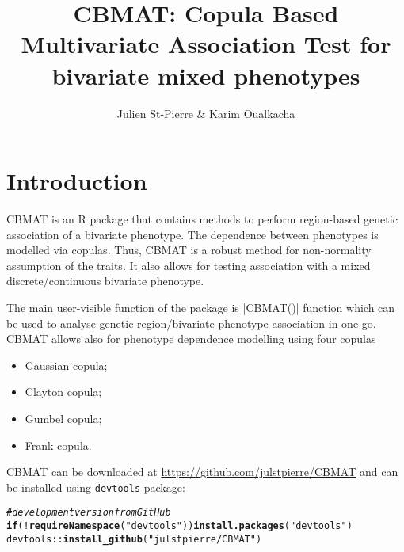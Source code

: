 \documentclass{article}\usepackage[]{graphicx}\usepackage[]{color}
\title{CBMAT: Copula Based Multivariate Association Test for bivariate mixed phenotypes}
\author{Julien St-Pierre \& Karim Oualkacha}
\makeatletter
\newcommand{\hlstr}[1]{\textcolor[rgb]{0.192,0.494,0.8}{#1}}%
\newcommand{\hlcom}[1]{\textcolor[rgb]{0.678,0.584,0.686}{\textit{#1}}}%
\newcommand{\hlopt}[1]{\textcolor[rgb]{0,0,0}{#1}}%
\newcommand{\hlstd}[1]{\textcolor[rgb]{0.345,0.345,0.345}{#1}}%
\newcommand{\hlkwa}[1]{\textcolor[rgb]{0.161,0.373,0.58}{\textbf{#1}}}%
\newcommand{\hlkwd}[1]{\textcolor[rgb]{0.737,0.353,0.396}{\textbf{#1}}}%
\newenvironment{kframe}{%
 \def\at@end@of@kframe{}%
 \ifinner\ifhmode%
  \def\at@end@of@kframe{\end{minipage}}%
  \begin{minipage}{\columnwidth}%
 \fi\fi%
 \def\FrameCommand##1{\hskip\@totalleftmargin \hskip-\fboxsep
 \colorbox{shadecolor}{##1}\hskip-\fboxsep
     \hskip-\linewidth \hskip-\@totalleftmargin \hskip\columnwidth}%
 \MakeFramed {\advance\hsize-\width
   \@totalleftmargin\z@ \linewidth\hsize
   \@setminipage}}%
 {\par\unskip\endMakeFramed%
 \at@end@of@kframe}
\newenvironment{knitrout}{}{} %
\makeatother
\begin{document}
\maketitle
\tableofcontents

\section{Introduction}
\label{sec:introduction}

CBMAT is an R package that contains methods to perform region-based genetic association of a bivariate phenotype. The dependence between phenotypes is modelled via copulas. Thus, CBMAT is a robust method for non-normality assumption of the traits. It also allows for testing association with a mixed discrete/continuous bivariate phenotype.

The main user-visible function of the package is |CBMAT()| function which can be used to analyse genetic region/bivariate phenotype association in one go. CBMAT allows also for phenotype dependence modelling using four copulas

\begin{itemize}
  \item Gaussian copula;
  \item Clayton copula;
  \item Gumbel copula;
  \item Frank copula.
\end{itemize}

CBMAT can be downloaded at \url{https://github.com/julstpierre/CBMAT} and can be installed using \texttt{devtools} package:
\begin{knitrout}
\color{fgcolor}\begin{kframe}
\begin{alltt}
\hlcom{# development version from GitHub}
\hlkwa{if} \hlstd{(}\hlopt{!}\hlkwd{requireNamespace}\hlstd{(}\hlstr{"devtools"}\hlstd{))} \hlkwd{install.packages}\hlstd{(}\hlstr{"devtools"}\hlstd{)}
\hlstd{devtools}\hlopt{::}\hlkwd{install_github}\hlstd{(}\hlstr{"julstpierre/CBMAT"}\hlstd{)}
\end{alltt}
\end{kframe}
\end{knitrout}
\end{document}
